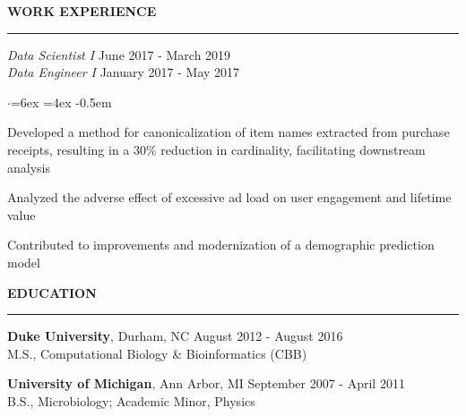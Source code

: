 \documentclass[11pt]{article}
\newenvironment{rSection}[1]{ %
  \sectionskip
  \MakeUppercase{\textbf{#1}} %
  \sectionlineskip
  \hrule %
  \begin{list}{}{ %
    \setlength{\leftmargin}{1.5em} %
  }
  \item[]
}{
  \end{list}
}
\def\sectionlineskip{\smallskip} %
\def\sectionskip{\smallskip} %
\begin{document}
\begin{rSection}{Work Experience}
{\em \hspace*{2ex} Data Scientist I} \hfill June 2017 - March 2019 \\
{\em \hspace*{2ex} Data Engineer I} \hfill January 2017 - May 2017

\begin{list}{$\cdot$}{\leftmargin=6ex \rightmargin=4ex} %
   \itemsep -0.5em \vspace{-0.5em} %
   \item Developed a method for canonicalization of item names extracted from purchase receipts, resulting in a 30\% reduction in cardinality, facilitating downstream analysis
   \item Analyzed the adverse effect of excessive ad load on user engagement and lifetime value
   \item Contributed to improvements and modernization of a demographic prediction model
\end{list}

\end{rSection}


\begin{rSection}{Education}

{\bfseries Duke University}, Durham, NC \hfill August 2012 - August 2016 \\
\hspace*{2ex} M.S., Computational Biology \& Bioinformatics (CBB)

\vspace{-1ex}
{\bfseries University of Michigan}, Ann Arbor, MI \hfill September 2007 - April 2011 \\
\hspace*{2ex} B.S., Microbiology; Academic Minor, Physics

\end{rSection}
\end{document}
